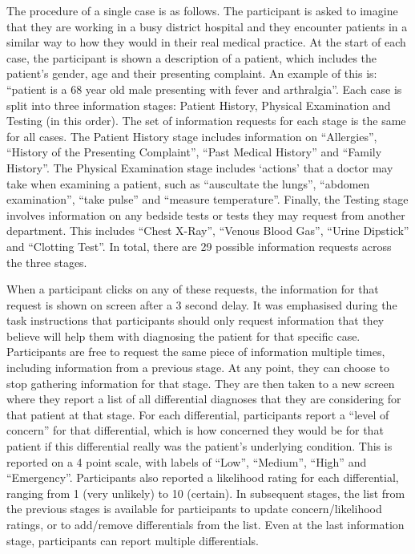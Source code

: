 \documentclass[a4paper, nobind]{templates/ociamthesis}
\begin{document}
The procedure of a single case is as follows. The participant is asked to imagine that they are working in a busy district hospital and they encounter patients in a similar way to how they would in their real medical practice. At the start of each case, the participant is shown a description of a patient, which includes the patient's gender, age and their presenting complaint. An example of this is: ``patient is a 68 year old male presenting with fever and arthralgia''. Each case is split into three information stages: Patient History, Physical Examination and Testing (in this order). The set of information requests for each stage is the same for all cases. The Patient History stage includes information on ``Allergies'', ``History of the Presenting Complaint'', ``Past Medical History'' and ``Family History''. The Physical Examination stage includes `actions' that a doctor may take when examining a patient, such as ``auscultate the lungs'', ``abdomen examination'', ``take pulse'' and ``measure temperature''. Finally, the Testing stage involves information on any bedside tests or tests they may request from another department. This includes ``Chest X-Ray'', ``Venous Blood Gas'', ``Urine Dipstick'' and ``Clotting Test''. In total, there are 29 possible information requests across the three stages.

When a participant clicks on any of these requests, the information for that request is shown on screen after a 3 second delay. It was emphasised during the task instructions that participants should only request information that they believe will help them with diagnosing the patient for that specific case. Participants are free to request the same piece of information multiple times, including information from a previous stage. At any point, they can choose to stop gathering information for that stage. They are then taken to a new screen where they report a list of all differential diagnoses that they are considering for that patient at that stage. For each differential, participants report a ``level of concern'' for that differential, which is how concerned they would be for that patient if this differential really was the patient's underlying condition. This is reported on a 4 point scale, with labels of ``Low'', ``Medium'', ``High'' and ``Emergency''. Participants also reported a likelihood rating for each differential, ranging from 1 (very unlikely) to 10 (certain). In subsequent stages, the list from the previous stages is available for participants to update concern/likelihood ratings, or to add/remove differentials from the list. Even at the last information stage, participants can report multiple differentials.
\end{document}
